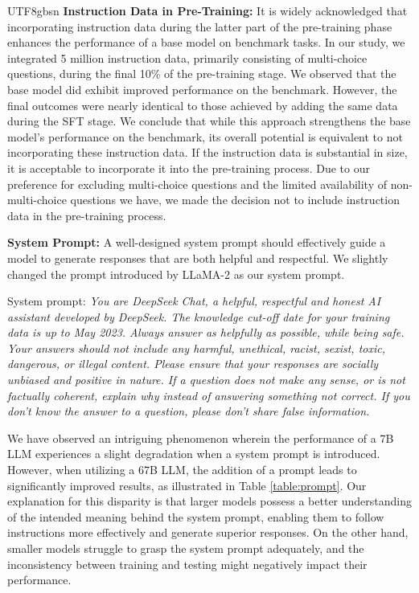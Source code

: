 \documentclass[11pt, a4paper, logo, copyright, nonumbering]{deepseek}
\begin{document}
\begin{CJK*}{UTF8}{gbsn}
\textbf{Instruction Data in Pre-Training:} It is widely acknowledged that incorporating instruction data during the latter part of the pre-training phase enhances the performance of a base model on benchmark tasks. In our study, we integrated 5 million instruction data, primarily consisting of multi-choice questions, during the final 10\% of the pre-training stage. We observed that the base model did exhibit improved performance on the benchmark. However, the final outcomes were nearly identical to those achieved by adding the same data during the SFT stage. We conclude that while this approach strengthens the base model's performance on the benchmark, its overall potential is equivalent to not incorporating these instruction data. If the instruction data is substantial in size, it is acceptable to incorporate it into the pre-training process. Due to our preference for excluding multi-choice questions and the limited availability of non-multi-choice questions we have, we made the decision not to include instruction data in the pre-training process. 

\textbf{System Prompt:} A well-designed system prompt should effectively guide a model to generate responses that are both helpful and respectful. We slightly changed the prompt introduced by LLaMA-2 as our system prompt. 

System prompt: \textit{You are DeepSeek Chat, a helpful, respectful and honest AI assistant developed by DeepSeek. The knowledge cut-off date for your training data is up to May 2023. Always answer as helpfully as possible, while being safe. Your answers should not include any harmful, unethical, racist, sexist, toxic, dangerous, or illegal content. Please ensure that your responses are socially unbiased and positive in nature. If a question does not make any sense, or is not factually coherent, explain why instead of answering something not correct. If you don’t know the answer to a question, please don’t share false information.}  

We have observed an intriguing phenomenon wherein the performance of a 7B LLM experiences a slight degradation when a system prompt is introduced. However, when utilizing a 67B LLM, the addition of a prompt leads to significantly improved results, as illustrated in Table \ref{table:prompt}. Our explanation for this disparity is that larger models possess a better understanding of the intended meaning behind the system prompt, enabling them to follow instructions more effectively and generate superior responses. On the other hand, smaller models struggle to grasp the system prompt adequately, and the inconsistency between training and testing might negatively impact their performance.


\end{CJK*}
\end{document}
